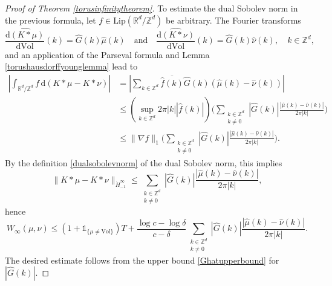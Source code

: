 \documentclass[10pt,a4paper]{amsart}
\begin{document}
\begin{proof}[Proof of Theorem \ref{torusinfinitytheorem}]
To estimate the dual Sobolev norm in the previous formula, let $f \in \mathrm{Lip}(\mathbb{R}^d / \mathbb{Z}^d)$ be arbitrary. The Fourier transforms
\[ \widehat{\frac{\mathrm{d}(K*\mu)}{\mathrm{d}\mathrm{Vol}}}(k) = \widehat{G}(k) \widehat{\mu}(k) \quad \textrm{and} \quad \widehat{\frac{\mathrm{d}(K*\nu)}{\mathrm{d}\mathrm{Vol}}}(k) = \widehat{G}(k) \widehat{\nu}(k), \quad k \in \mathbb{Z}^d, \]
and an application of the Parseval formula and Lemma \ref{torushausdorffyounglemma} lead to
\[ \begin{split} \left| \int_{\mathbb{R}^d / \mathbb{Z}^d} f \, \mathrm{d} (K*\mu - K*\nu) \right| &= \left| \sum_{k \in \mathbb{Z}^d} \overline{\widehat{f}(k)} \widehat{G}(k) (\widehat{\mu}(k) - \widehat{\nu}(k)) \right| \\ &\le \left( \sup_{k \in \mathbb{Z}^d} 2 \pi |k| |\widehat{f}(k)| \right) \Bigg( \sum_{\substack{k \in \mathbb{Z}^d \\ k \neq 0}} |\widehat{G}(k)| \frac{|\widehat{\mu}(k) - \widehat{\nu}(k)|}{2 \pi |k|} \Bigg) \\ &\le \| \nabla f \|_1 \Bigg( \sum_{\substack{k \in \mathbb{Z}^d \\ k \neq 0}} |\widehat{G}(k)| \frac{|\widehat{\mu}(k) - \widehat{\nu}(k)|}{2 \pi |k|} \Bigg). \end{split} \]
By the definition \eqref{dualsobolevnorm} of the dual Sobolev norm, this implies
\[ \| K*\mu - K*\nu \|_{\dot{H}_{-1}^{\infty}} \le \sum_{\substack{k \in \mathbb{Z}^d \\ k \neq 0}} |\widehat{G}(k)| \frac{|\widehat{\mu}(k) - \widehat{\nu}(k)|}{2 \pi |k|}, \]
hence
\[ W_{\infty} (\mu, \nu) \le \left( 1+\mathds{1}_{\{ \mu \neq \mathrm{Vol} \}} \right) T + \frac{\log c - \log \delta}{c-\delta} \sum_{\substack{k \in \mathbb{Z}^d \\ k \neq 0}} |\widehat{G}(k)| \frac{|\widehat{\mu}(k) - \widehat{\nu}(k)|}{2 \pi |k|} . \]
The desired estimate follows from the upper bound \eqref{Ghatupperbound} for $|\widehat{G}(k)|$.
\end{proof}
\end{document}
